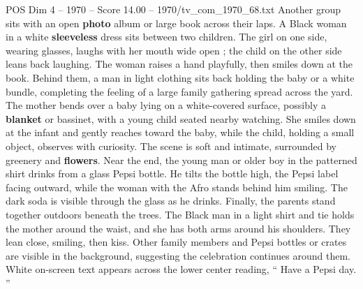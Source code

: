 \begin{textsample}{POS Dim 4 – 1970 – Score 14.00 – 1970/tv\_com\_1970\_68.txt}
Another group sits with an open \textbf{photo} album or large book across their laps.
A Black woman in a white \textbf{sleeveless} dress sits between two children.
The girl on one side, wearing glasses, laughs with her mouth wide open ; the child on the other side leans back laughing.
The woman raises a hand playfully, then smiles down at the book.
Behind them, a man in light clothing sits back holding the baby or a white bundle, completing the feeling of a large family gathering spread across the yard.
The mother bends over a baby lying on a white-covered surface, possibly a \textbf{blanket} or bassinet, with a young child seated nearby watching.
She smiles down at the infant and gently reaches toward the baby, while the child, holding a small object, observes with curiosity.
The scene is soft and intimate, surrounded by greenery and \textbf{flowers}.
Near the end, the young man or older boy in the patterned shirt drinks from a glass Pepsi bottle.
He tilts the bottle high, the Pepsi label facing outward, while the woman with the Afro stands behind him smiling.
The dark soda is visible through the glass as he drinks.
Finally, the parents stand together outdoors beneath the trees.
The Black man in a light shirt and tie holds the mother around the waist, and she has both arms around his shoulders.
They lean close, smiling, then kiss.
Other family members and Pepsi bottles or crates are visible in the background, suggesting the celebration continues around them.
White on-screen text appears across the lower center reading, “ Have a Pepsi day. ”

\end{textsample}

